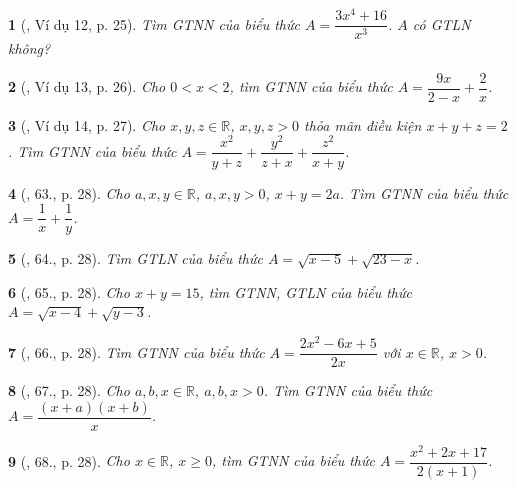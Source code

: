 \documentclass{article}
\newtheorem{baitoan}{}
\begin{document}
\begin{baitoan}[\cite{Tuyen_Toan_9_old}, Ví dụ 12, p. 25]
	Tìm {\rm GTNN} của biểu thức $A = \dfrac{3x^4 + 16}{x^3}$. $A$ có {\rm GTLN} không?
\end{baitoan}

\begin{baitoan}[\cite{Tuyen_Toan_9_old}, Ví dụ 13, p. 26]
	Cho $0 < x < 2$, tìm {\rm GTNN} của biểu thức $A = \dfrac{9x}{2 - x} + \dfrac{2}{x}$. 
\end{baitoan}

\begin{baitoan}[\cite{Tuyen_Toan_9_old}, Ví dụ 14, p. 27]
	Cho $x,y,z\in\mathbb{R}$, $x,y,z > 0$ thỏa mãn điều kiện $x + y + z = 2$. Tìm {\rm GTNN} của biểu thức $A = \dfrac{x^2}{y + z} + \dfrac{y^2}{z + x} + \dfrac{z^2}{x + y}$.
\end{baitoan}

\begin{baitoan}[\cite{Tuyen_Toan_9_old}, 63., p. 28]
	Cho $a,x,y\in\mathbb{R}$, $a,x,y > 0$, $x + y = 2a$. Tìm {\rm GTNN} của biểu thức $A = \dfrac{1}{x} + \dfrac{1}{y}$.
\end{baitoan}

\begin{baitoan}[\cite{Tuyen_Toan_9_old}, 64., p. 28]
	Tìm {\rm GTLN} của biểu thức $A = \sqrt{x - 5} + \sqrt{23 - x}$.
\end{baitoan}

\begin{baitoan}[\cite{Tuyen_Toan_9_old}, 65., p. 28]
	Cho $x + y = 15$, tìm {\rm GTNN}, {\rm GTLN} của biểu thức $A = \sqrt{x - 4} + \sqrt{y - 3}$.
\end{baitoan}

\begin{baitoan}[\cite{Tuyen_Toan_9_old}, 66., p. 28]
	Tìm {\rm GTNN} của biểu thức $A = \dfrac{2x^2 - 6x + 5}{2x}$ với $x\in\mathbb{R}$, $x > 0$.
\end{baitoan}

\begin{baitoan}[\cite{Tuyen_Toan_9_old}, 67., p. 28]
	Cho $a,b,x\in\mathbb{R}$, $a,b,x > 0$. Tìm {\rm GTNN} của biểu thức $A = \dfrac{(x + a)(x + b)}{x}$.
\end{baitoan}

\begin{baitoan}[\cite{Tuyen_Toan_9_old}, 68., p. 28]
	Cho $x\in\mathbb{R}$, $x\ge0$, tìm {\rm GTNN} của biểu thức $A = \dfrac{x^2 + 2x + 17}{2(x + 1)}$.
\end{baitoan}
\end{document}
